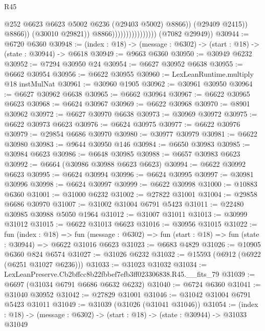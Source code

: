 \begin{lexlean}{R45}
\begin{coremodule}
{                                                  @252
                                                  @6623
                                                  @6623
                                                  @5002
                                                  @6236
                                                  (@29403 @5002)
                                                  @8866))
                                              (@29409 @2415))
                                            @8866))
                                        (@30010 @29821))
                                      @8866))))))))))))))))
      (@7082 @29949))
@30944 := @6720 @6360
@30948 := (index : @18) -> (message : @6302) -> (start : @18) -> (state : @30944) -> @6618
@30949 := @9663 @6360
@30950 := @30949 @6232
@30952 := @7294 @30950 @24
@30954 := @6627 @30952 @6638
@30955 := @6662 @30954
@30956 := @6622 @30955
@30960 := LexLeanRuntime.multiply @18 instMulNat
@30961 := @30960 @1905
@30962 := @30961 @30950
@30964 := @6627 @30962 @6638
@30965 := @6662 @30964
@30967 := @6622 @30965 @6623
@30968 := @6624 @30967
@30969 := @6622 @30968
@30970 := @8901 @30962
@30972 := @6627 @30970 @6638
@30973 := @30969 @30972
@30975 := @6622 @30973 @6623
@30976 := @6624 @30975
@30977 := @6622 @30976
@30979 := @29854 @6686 @30970
@30980 := @30977 @30979
@30981 := @6622 @30980
@30983 := @9644 @30950 @146
@30984 := @6650 @30983
@30985 := @30984 @6623
@30986 := @6648 @30985
@30988 := @6657 @30983 @6623
@30992 := @6664 (@30986 @30988 @6623 @6623)
@30994 := @6622 @30992 @6623
@30995 := @6624 @30994
@30996 := @6624 @30995
@30997 := @30981 @30996
@30998 := @6624 @30997
@30999 := @6622 @30998
@31000 := @10883 @6360
@31001 := @31000 @6232
@31002 := @27822 @31001
@31004 := @29858 @6686 @30970
@31007 := @31002 @31004 @6791 @5423
@31011 := @22480 @30985 @30988 @5050 @1964
@31012 := @31007 @31011
@31013 := @30999 @31012
@31015 := @6622 @31013 @6623
@31016 := @30956 @31015
@31022 := fun (index : @18) =>
  fun (message : @6302) => fun (start : @18) => fun (state : @30944) => @6622 @31016 @6623
@31023 := @6683 @4829
@31026 := @10905 @6360 @824 @6574
@31027 := @31026 @6232
@31032 := @15593 (@6912 (@6922 (@6251 @31027 @6236)))
@31033 := @31023 @31032
@31034 := LexLeanPreserve.Cb2bffcc8b22fbbef7efb3ff023306838.R45.__fits_79
@31039 := @6697 (@31034 @6791 @6686 @6632 @6232)
@31040 := @6724 @6360
@31041 := @31040 @30952
@31042 := @27829 @31001
@31046 := @31042 @31004 @6791 @5423 @31011
@31049 := @31039 (@31026 (@31041 @31046))
@31054 := (index : @18) -> (message : @6302) -> (start : @18) -> (state : @30944) -> @31033 @31049
}
\end{coremodule}
\end{lexlean}
